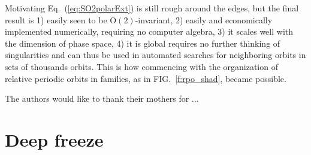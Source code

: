 \documentclass[aip,cha,showpacs,reprint]{revtex4-1} %
\newcommand{\beq}{\begin{equation}}
\newcommand{\eeq}{\end{equation}}
\newcommand{\refeq}  [1] {Eq.~(\ref{#1})}                   %
\newcommand{\reffig} [1] {FIG.~\ref{#1}}                    %
\newcommand{\ie}{{i.e.}}
\newcommand{\KSe}{Kuramoto-Siva\-shin\-sky equation}
\newcommand{\On}[1]{\ensuremath{\textrm{O}(#1)}}
\begin{document}
Motivating \refeq{eq:SO2polarExt}
    \PC{was \refeq{eq:O2inv}??}
is still rough around the edges, but the final result is
1) easily seen to be $\On{2}$-invariant, 2) easily and economically
implemented numerically, requiring no computer algebra, 3) it scales well
with the dimension of phase space, 4) it is global requires no further
thinking of singularities and can thus be used in automated searches for
neighboring orbits in sets of thousands orbits. This is how commencing with the
organization of relative periodic orbits in families, as in \reffig{f:rpo_shad},
became possible.

\begin{acknowledgments}
The authors would like to thank their mothers for ...
\end{acknowledgments}

\appendix

%
%
%



                \ifdraft\newpage
\section{Deep freeze\label{c-freeze}}

                \fi
\end{document}
